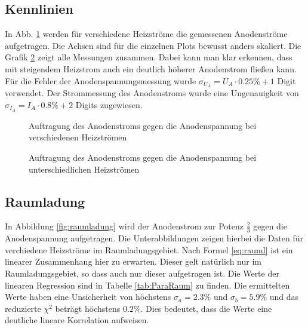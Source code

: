 \documentclass[12pt,a4paper,titlepage,headinclude,bibtotoc]{scrartcl}
\begin{document}
\subsection{Kennlinien}
In Abb. \ref{fig:heiz} werden für verschiedene Heizströme die gemessenen Anodenströme aufgetragen.
Die Achsen sind für die einzelnen Plots bewusst anders skaliert.
Die Grafik \ref{fig:h} zeigt alle Messungen zusammen.
Dabei kann man klar erkennen, dass mit steigendem Heizstrom auch ein deutlich höherer Anodenstrom fließen kann.
Für die Fehler der Anodenspannungsmessung wurde $\sigma_{U_A}=U_A\cdot 0.25\%+1$ Digit verwendet.
Der Strommessung des Anodenstroms wurde eine Ungenauigkeit von $\sigma_{I_A}= I_A\cdot 0.8\%+2$ Digits zugewiesen.
\begin{figure}[h]
  \centering
  \hfill
  \hfill
  \caption{Auftragung des Anodenstroms gegen die Anodenspannung bei verschiedenen Heizströmen}
  \label{fig:heiz}
\end{figure}
\begin{figure}[!h]
	\centering
	
	\caption{Auftragung des Anodenstroms gegen die Anodenspannung bei unterschiedlichen Heizströmen}
	\label{fig:h}
\end{figure}


\subsection{Raumladung}
In Abbildung \ref{fig:raumladung} wird der Anodenstrom zur Potenz $\frac{2}{3}$ gegen die Anodenspannung aufgetragen.
Die Unterabbildungen zeigen hierbei die Daten für verchiedene Heizströme im Raumladungsgebiet.
Nach Formel \eqref{eq:rauml} ist ein linearer Zusammenhang hier zu erwarten.
Dieser gelt natürlich nur im Raumladungsgebiet, so dass auch nur dieser aufgetragen ist.
Die Werte der linearen Regression sind in Tabelle \ref{tab:ParaRaum} zu finden.
Die ermittelten Werte haben eine Unsicherheit von höchstens $\sigma_a = 2.3\%$ und $\sigma_b=5.9\%$ und das reduzierte $\chi^2$ beträgt höchstens $0.2\%$.
Dies bedeutet, dass die Werte eine deutliche lineare Korrelation aufweisen.
\end{document}
